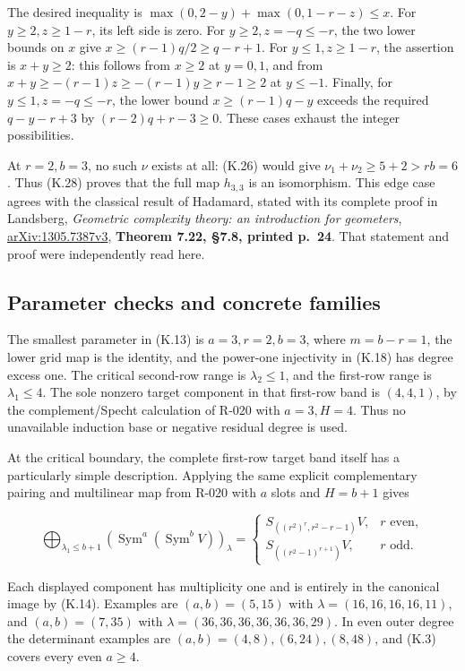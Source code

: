 \documentclass[
  10pt,
]{article}
\begin{document}
The desired inequality is \(\max(0,2-y)+\max(0,1-r-z)\le x\). For
\(y\ge2,z\ge1-r\), its left side is zero. For \(y\ge2,z=-q\le-r\), the
two lower bounds on \(x\) give \(x\ge(r-1)q/2\ge q-r+1\). For
\(y\le1,z\ge1-r\), the assertion is \(x+y\ge2\): this follows from
\(x\ge2\) at \(y=0,1\), and from \(x+y\ge-(r-1)z\ge-(r-1)y\ge r-1\ge2\)
at \(y\le-1\). Finally, for \(y\le1,z=-q\le-r\), the lower bound
\(x\ge(r-1)q-y\) exceeds the required \(q-y-r+3\) by \((r-2)q+r-3\ge0\).
These cases exhaust the integer possibilities.

At \(r=2,b=3\), no such \(\nu\) exists at all: (K.26) would give
\(\nu_1+\nu_2\ge5+2>rb=6\). Thus (K.28) proves that the full map
\(h_{3,3}\) is an isomorphism. This edge case agrees with the classical
result of Hadamard, stated with its complete proof in Landsberg,
\emph{Geometric complexity theory: an introduction for geometers},
\href{https://arxiv.org/pdf/1305.7387}{arXiv:1305.7387v3},
\textbf{Theorem 7.22, §7.8, printed p.~24}. That statement and proof
were independently read here.

\subsection{Parameter checks and concrete
families}\label{parameter-checks-and-concrete-families}

The smallest parameter in (K.13) is \(a=3,r=2,b=3\), where \(m=b-r=1\),
the lower grid map is the identity, and the power-one injectivity in
(K.18) has degree excess one. The critical second-row range is
\(\lambda_2\le1\), and the first-row range is \(\lambda_1\le4\). The
sole nonzero target component in that first-row band is \((4,4,1)\), by
the complement/Specht calculation of R-020 with \(a=3,H=4\). Thus no
unavailable induction base or negative residual degree is used.

At the critical boundary, the complete first-row target band itself has
a particularly simple description. Applying the same explicit
complementary pairing and multilinear map from R-020 with \(a\) slots
and \(H=b+1\) gives

\[
\bigoplus_{\lambda_1\le b+1}
\left(\operatorname{Sym}^a(\operatorname{Sym}^bV)\right)_\lambda
=
\begin{cases}
S_{((r^2)^r,r^2-r-1)}V,&r\text{ even},\\
S_{((r^2-1)^{r+1})}V,&r\text{ odd}.
\end{cases}
\tag{K.29}
\]

Each displayed component has multiplicity one and is entirely in the
canonical image by (K.14). Examples are \((a,b)=(5,15)\) with
\(\lambda=(16,16,16,16,11)\), and \((a,b)=(7,35)\) with
\(\lambda=(36,36,36,36,36,36,29)\). In even outer degree the determinant
examples are \((a,b)=(4,8),(6,24),(8,48)\), and (K.3) covers every even
\(a\ge4\).
\end{document}
